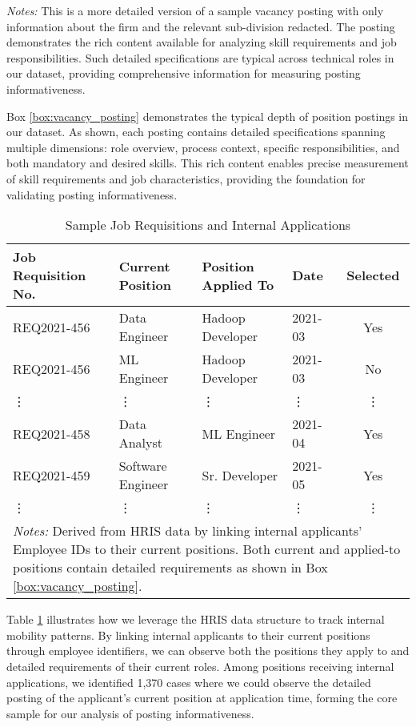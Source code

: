 \noindent \textit{Notes:} This is a more detailed version of a sample vacancy posting with only information about the firm and the relevant sub-division redacted. The posting demonstrates the rich content available for analyzing skill requirements and job responsibilities. Such detailed specifications are typical across technical roles in our dataset, providing comprehensive information for measuring posting informativeness.

Box \ref{box:vacancy_posting} demonstrates the typical depth of position postings in our dataset. As shown, each posting contains detailed specifications spanning multiple dimensions: role overview, process context, specific responsibilities, and both mandatory and desired skills. This rich content enables precise measurement of skill requirements and job characteristics, providing the foundation for validating posting informativeness.

\begin{table}[t]
    \caption{Sample Job Requisitions and Internal Applications}
    \begin{tabular*}{\textwidth}{@{\extracolsep\fill}llllc}
    \toprule
    Job Requisition No. & Current Position & Position Applied To & Date & Selected \\
    \midrule
    REQ2021-456 & Data Engineer & Hadoop Developer & 2021-03 & Yes \\
    REQ2021-456 & ML Engineer & Hadoop Developer & 2021-03 & No \\
    \vdots & \vdots & \vdots & \vdots & \vdots \\
    REQ2021-458 & Data Analyst & ML Engineer & 2021-04 & Yes \\
    REQ2021-459 & Software Engineer & Sr. Developer & 2021-05 & Yes \\
    \vdots & \vdots & \vdots & \vdots & \vdots \\
    \bottomrule
    \multicolumn{5}{p{\textwidth}}{\footnotesize \textit{Notes:} Derived from HRIS data by linking internal applicants' Employee IDs to their current positions. Both current and applied-to positions contain detailed requirements as shown in Box \ref{box:vacancy_posting}.} \\
    \end{tabular*}
    \label{tab:requisitions}
\end{table}

Table \ref{tab:requisitions} illustrates how we leverage the HRIS data structure to track internal mobility patterns. By linking internal applicants to their current positions through employee identifiers, we can observe both the positions they apply to and detailed requirements of their current roles. Among positions receiving internal applications, we identified 1,370 cases where we could observe the detailed posting of the applicant's current position at application time, forming the core sample for our analysis of posting informativeness.

